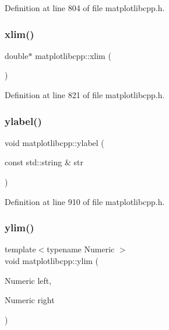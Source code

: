 Definition at line 804 of file matplotlibcpp.\+h.

\mbox{\label{namespacematplotlibcpp_a8a7686cbe6e2e82e8bd09add8571b31c}} 
\subsubsection{\texorpdfstring{xlim()}{xlim()}\hspace{0.1cm}{\footnotesize\ttfamily [2/2]}}
{\footnotesize\ttfamily double$\ast$ matplotlibcpp\+::xlim (\begin{DoxyParamCaption}{ }\end{DoxyParamCaption})\hspace{0.3cm}{\ttfamily [inline]}}



Definition at line 821 of file matplotlibcpp.\+h.

\mbox{\label{namespacematplotlibcpp_a5fa0cba78b9695adc213d2d952168442}} 
\subsubsection{\texorpdfstring{ylabel()}{ylabel()}}
{\footnotesize\ttfamily void matplotlibcpp\+::ylabel (\begin{DoxyParamCaption}\item[{const std\+::string \&}]{str }\end{DoxyParamCaption})\hspace{0.3cm}{\ttfamily [inline]}}



Definition at line 910 of file matplotlibcpp.\+h.

\mbox{\label{namespacematplotlibcpp_a4645651772918e2dad7d36d9eeaeaefa}} 
\subsubsection{\texorpdfstring{ylim()}{ylim()}\hspace{0.1cm}{\footnotesize\ttfamily [1/2]}}
{\footnotesize\ttfamily template$<$typename Numeric $>$ \\
void matplotlibcpp\+::ylim (\begin{DoxyParamCaption}\item[{Numeric}]{left,  }\item[{Numeric}]{right }\end{DoxyParamCaption})}



